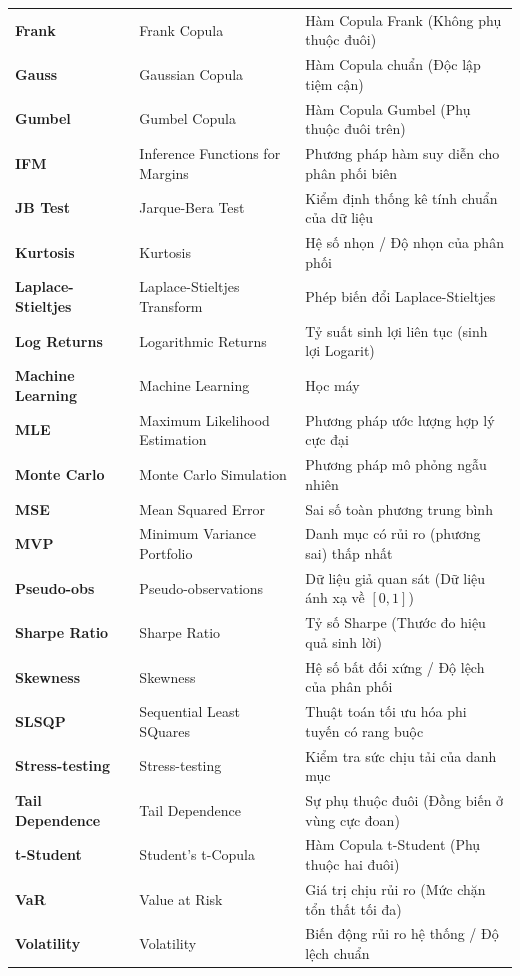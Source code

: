 \documentclass[a4paper,12pt]{article}
\begin{document}
\begin{longtable}{@{} p{3cm} p{5.5cm} p{7cm} @{}}
    \textbf{Frank} & Frank Copula & Hàm Copula Frank (Không phụ thuộc đuôi) \\
    \textbf{Gauss} & Gaussian Copula & Hàm Copula chuẩn (Độc lập tiệm cận) \\
    \textbf{Gumbel} & Gumbel Copula & Hàm Copula Gumbel (Phụ thuộc đuôi trên) \\
    \textbf{IFM} & Inference Functions for Margins & Phương pháp hàm suy diễn cho phân phối biên \\
    \textbf{JB Test} & Jarque-Bera Test & Kiểm định thống kê tính chuẩn của dữ liệu \\
    \textbf{Kurtosis} & Kurtosis & Hệ số nhọn / Độ nhọn của phân phối \\
    \textbf{Laplace-Stieltjes}& Laplace-Stieltjes Transform & Phép biến đổi Laplace-Stieltjes \\
    \textbf{Log Returns} & Logarithmic Returns & Tỷ suất sinh lợi liên tục (sinh lợi Logarit) \\
    \textbf{Machine Learning}& Machine Learning & Học máy \\
    \textbf{MLE} & Maximum Likelihood Estimation & Phương pháp ước lượng hợp lý cực đại \\
    \textbf{Monte Carlo} & Monte Carlo Simulation & Phương pháp mô phỏng ngẫu nhiên \\
    \textbf{MSE} & Mean Squared Error & Sai số toàn phương trung bình \\
    \textbf{MVP} & Minimum Variance Portfolio & Danh mục có rủi ro (phương sai) thấp nhất \\
    \textbf{Pseudo-obs} & Pseudo-observations & Dữ liệu giả quan sát (Dữ liệu ánh xạ về $[0,1]$) \\
    \textbf{Sharpe Ratio} & Sharpe Ratio & Tỷ số Sharpe (Thước đo hiệu quả sinh lời) \\
    \textbf{Skewness} & Skewness & Hệ số bất đối xứng / Độ lệch của phân phối \\
    \textbf{SLSQP} & Sequential Least SQuares & Thuật toán tối ưu hóa phi tuyến có rang buộc \\
    \textbf{Stress-testing} & Stress-testing & Kiểm tra sức chịu tải của danh mục \\
    \textbf{Tail Dependence} & Tail Dependence & Sự phụ thuộc đuôi (Đồng biến ở vùng cực đoan) \\
    \textbf{t-Student} & Student's t-Copula & Hàm Copula t-Student (Phụ thuộc hai đuôi) \\
    \textbf{VaR} & Value at Risk & Giá trị chịu rủi ro (Mức chặn tổn thất tối đa) \\
    \textbf{Volatility} & Volatility & Biến động rủi ro hệ thống / Độ lệch chuẩn \\ 
\end{longtable}
\end{document}
